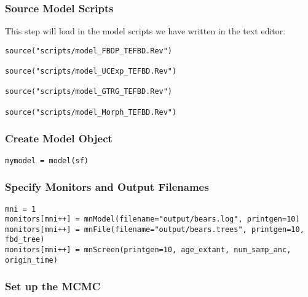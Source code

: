 \medskip
\subsubsection{Source Model Scripts}\label{subsub:RB-SourceMods}

This step will load in the model scripts we have written in the text editor.

{\tt \begin{snugshade*}
\begin{lstlisting}
source("scripts/model_FBDP_TEFBD.Rev")

source("scripts/model_UCExp_TEFBD.Rev")

source("scripts/model_GTRG_TEFBD.Rev")

source("scripts/model_Morph_TEFBD.Rev")
\end{lstlisting}
\end{snugshade*}}



\medskip
\subsubsection{Create Model Object}\label{subsub:RB-ModObj}


{\tt \begin{snugshade*}
\begin{lstlisting}
mymodel = model(sf)
\end{lstlisting}
\end{snugshade*}}

\medskip
\subsubsection{Specify Monitors and Output Filenames}\label{subsub:RB-Monitors}


{\tt \begin{snugshade*}
\begin{lstlisting}
mni = 1
monitors[mni++] = mnModel(filename="output/bears.log", printgen=10)
monitors[mni++] = mnFile(filename="output/bears.trees", printgen=10, fbd_tree)
monitors[mni++] = mnScreen(printgen=10, age_extant, num_samp_anc, origin_time)
\end{lstlisting}
\end{snugshade*}}

\medskip
\subsubsection{Set up the MCMC}


